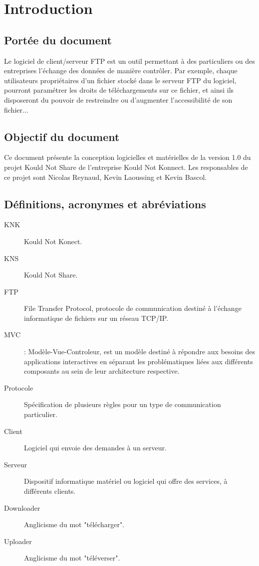 \documentclass[10pt,a4paper]{report}
\begin{document}

\section{Introduction}


\subsection{Portée du document}
Le logiciel de client/serveur FTP est un outil permettant à des particuliers ou des entreprises l'échange des données de manière contrôler. Par exemple, chaque utilisateurs propriétaires d'un fichier stocké dans le serveur FTP du logiciel, pourront paramétrer les droits de téléchargements sur ce fichier, et ainsi ils disposeront du pouvoir de restreindre ou d'augmenter l'accessibilité de son fichier...

\subsection{Objectif du document}
\begin{flushleft}
Ce document présente la conception logicielles et matérielles de la version 1.0 du projet Kould Not Share de l'entreprise Kould Not Konnect. Les responsables de ce projet sont Nicolas Reynaud, Kevin Laoussing et Kevin Bascol.
\end{flushleft}

\subsection{Définitions, acronymes et abréviations}
\begin{description}
\item[KNK] Kould Not Konect.
\item[KNS] Kould Not Share.
\item[FTP] File Transfer Protocol, protocole de communication destiné à l'échange informatique de fichiers sur un réseau TCP/IP.
\item [MVC] : Modèle-Vue-Controleur, est un modèle destiné à répondre aux besoins des applications interactives en séparant les problématiques liées aux différents composants au sein de leur architecture respective.
\item[Protocole] Spécification de plusieurs règles pour un type de communication particulier.
\item[Client] Logiciel qui envoie des demandes à un serveur.
\item[Serveur] Dispositif informatique matériel ou logiciel qui offre des services, à différents clients.
\item[Downloader] Anglicisme du mot "télécharger".
\item[Uploader] Anglicisme du mot "téléverser".
\end{description}
\end{document}
